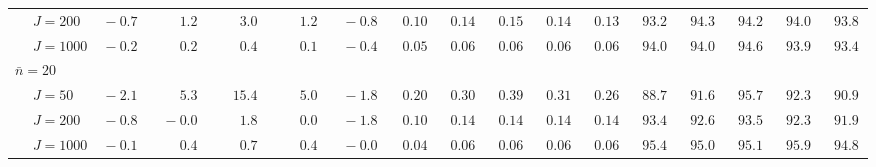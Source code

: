 \begin{sidewaystable}
\begin{threeparttable}
\begin{tabular}{llccccccccccccccc}
 & \nopagebreak $\;J=200$  & $\phantom{0}{-}0.7\phantom{0}$ & $\phantom{0}\phantom{-}1.2\phantom{0}$ & $\phantom{0}\phantom{-}3.0\phantom{0}$ & $\phantom{0}\phantom{-}1.2\phantom{0}$ & $\phantom{0}{-}0.8\phantom{0}$ & $\phantom{0}0.10\phantom{0}$ & $\phantom{0}0.14\phantom{0}$ & $\phantom{0}0.15\phantom{0}$ & $\phantom{0}0.14\phantom{0}$ & $\phantom{0}0.13\phantom{0}$ & $\phantom{0}93.2\phantom{0}$ & $\phantom{0}94.3\phantom{0}$ & $\phantom{0}94.2\phantom{0}$ & $\phantom{0}94.0\phantom{0}$ & $\phantom{0}93.8\phantom{0}$ \\
 & \nopagebreak $\;J=1000$  & $\phantom{0}{-}0.2\phantom{0}$ & $\phantom{0}\phantom{-}0.2\phantom{0}$ & $\phantom{0}\phantom{-}0.4\phantom{0}$ & $\phantom{0}\phantom{-}0.1\phantom{0}$ & $\phantom{0}{-}0.4\phantom{0}$ & $\phantom{0}0.05\phantom{0}$ & $\phantom{0}0.06\phantom{0}$ & $\phantom{0}0.06\phantom{0}$ & $\phantom{0}0.06\phantom{0}$ & $\phantom{0}0.06\phantom{0}$ & $\phantom{0}94.0\phantom{0}$ & $\phantom{0}94.0\phantom{0}$ & $\phantom{0}94.6\phantom{0}$ & $\phantom{0}93.9\phantom{0}$ & $\phantom{0}93.4\phantom{0}$ \\
\multicolumn{4}{l}{$\bar{n}=20$} \\  & \nopagebreak $\;J=50$  & $\phantom{0}{-}2.1\phantom{0}$ & $\phantom{0}\phantom{-}5.3\phantom{0}$ & $\phantom{-}15.4\phantom{0}$ & $\phantom{0}\phantom{-}5.0\phantom{0}$ & $\phantom{0}{-}1.8\phantom{0}$ & $\phantom{0}0.20\phantom{0}$ & $\phantom{0}0.30\phantom{0}$ & $\phantom{0}0.39\phantom{0}$ & $\phantom{0}0.31\phantom{0}$ & $\phantom{0}0.26\phantom{0}$ & $\phantom{0}88.7\phantom{0}$ & $\phantom{0}91.6\phantom{0}$ & $\phantom{0}95.7\phantom{0}$ & $\phantom{0}92.3\phantom{0}$ & $\phantom{0}90.9\phantom{0}$ \\
 & \nopagebreak $\;J=200$  & $\phantom{0}{-}0.8\phantom{0}$ & $\phantom{0}{-}0.0\phantom{0}$ & $\phantom{0}\phantom{-}1.8\phantom{0}$ & $\phantom{0}\phantom{-}0.0\phantom{0}$ & $\phantom{0}{-}1.8\phantom{0}$ & $\phantom{0}0.10\phantom{0}$ & $\phantom{0}0.14\phantom{0}$ & $\phantom{0}0.14\phantom{0}$ & $\phantom{0}0.14\phantom{0}$ & $\phantom{0}0.14\phantom{0}$ & $\phantom{0}93.4\phantom{0}$ & $\phantom{0}92.6\phantom{0}$ & $\phantom{0}93.5\phantom{0}$ & $\phantom{0}92.3\phantom{0}$ & $\phantom{0}91.9\phantom{0}$ \\
 & \nopagebreak $\;J=1000$  & $\phantom{0}{-}0.1\phantom{0}$ & $\phantom{0}\phantom{-}0.4\phantom{0}$ & $\phantom{0}\phantom{-}0.7\phantom{0}$ & $\phantom{0}\phantom{-}0.4\phantom{0}$ & $\phantom{0}{-}0.0\phantom{0}$ & $\phantom{0}0.04\phantom{0}$ & $\phantom{0}0.06\phantom{0}$ & $\phantom{0}0.06\phantom{0}$ & $\phantom{0}0.06\phantom{0}$ & $\phantom{0}0.06\phantom{0}$ & $\phantom{0}95.4\phantom{0}$ & $\phantom{0}95.0\phantom{0}$ & $\phantom{0}95.1\phantom{0}$ & $\phantom{0}95.9\phantom{0}$ & $\phantom{0}94.8\phantom{0}$ \\

\end{tabular}
\end{threeparttable}
\end{sidewaystable}
